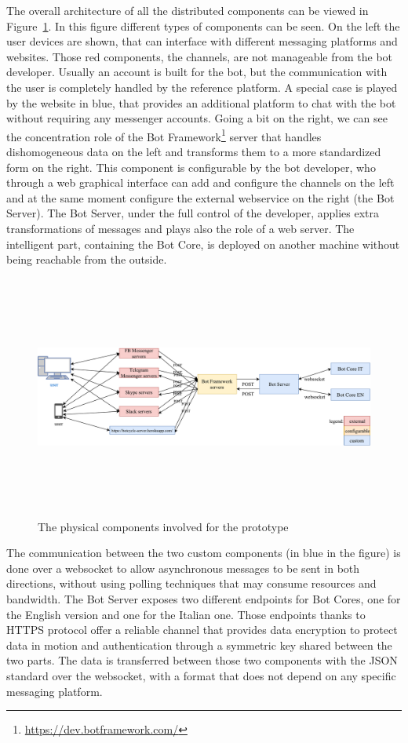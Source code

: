 The overall architecture of all the distributed components can be viewed in Figure~\ref{fig:physicalComponents}. In this figure different types of components can be seen. On the left the user devices are shown, that can interface with different messaging platforms and websites. Those red components, the channels, are not manageable from the bot developer. Usually an account is built for the bot, but the communication with the user is completely handled by the reference platform. A special case is played by the website in blue, that provides an additional platform to chat with the bot without requiring any messenger accounts. Going a bit on the right, we can see the concentration role of the Bot Framework\footnote{\url{https://dev.botframework.com/}} server that handles dishomogeneous data on the left and transforms them to a more standardized form on the right. This component is configurable by the bot developer, who through a web graphical interface can add and configure the channels on the left and at the same moment configure the external webservice on the right (the Bot Server). The Bot Server, under the full control of the developer, applies extra transformations of messages and plays also the role of a web server. The intelligent part, containing the Bot Core, is deployed on another machine without being reachable from the outside.

\begin{figure}[!htb]
    \centering
    \includegraphics[max width=0.9\linewidth,max height=8cm,keepaspectratio]{figures/physicalComponents}
    \caption{The physical components involved for the prototype}\label{fig:physicalComponents}
\end{figure}

The communication between the two custom components (in blue in the figure) is done over a websocket to allow asynchronous messages to be sent in both directions, without using polling techniques that may consume resources and bandwidth. The Bot Server exposes two different endpoints for Bot Cores, one for the English version and one for the Italian one. Those endpoints thanks to HTTPS protocol offer a reliable channel that provides data encryption to protect data in motion and authentication through a symmetric key shared between the two parts. The data is transferred between those two components with the JSON standard over the websocket, with a format that does not depend on any specific messaging platform.

